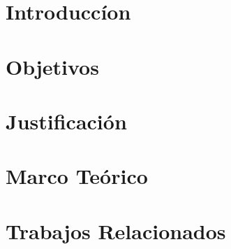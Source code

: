 \documentclass[journal]{IEEEtran}
\begin{document}



\maketitle





\section{Introduccíon}


\section{Objetivos}


\section{Justificación}


\section{Marco Teórico}


\section{Trabajos Relacionados}

\end{document}
